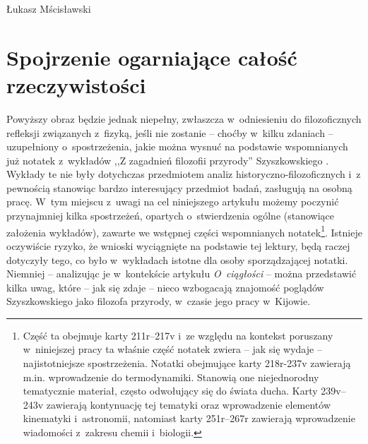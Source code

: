\begin{artplenv}{Łukasz Mścisławski}
\section{Spojrzenie ogarniające całość rzeczywistości}
Powyższy obraz będzie jednak niepełny, zwłaszcza w~odniesieniu do filozoficznych refleksji związanych z~fizyką, jeśli nie zostanie -- choćby w~kilku zdaniach -- uzupełniony o~spostrzeżenia, jakie można wysnuć na podstawie wspomnianych już notatek z~wykładów ,,Z zagadnień filozofii przyrody'' Szyszkowskiego
\parencite[por. ][k. 211–244]{noauthor_noty_1917}. %
 Wykłady te nie były dotychczas przedmiotem analiz historyczno-filozoficznych i~z pewnością stanowiąc bardzo interesujący przedmiot badań, zasługują na osobną pracę. W~tym miejscu z~uwagi na cel niniejszego artykułu możemy poczynić przynajmniej kilka spostrzeżeń, opartych o~stwierdzenia ogólne (stanowiące założenia wykładów), zawarte we wstępnej części wspomnianych notatek\footnote{Część ta obejmuje karty 211r–217v i~ze względu na kontekst poruszany w~niniejszej pracy ta właśnie część notatek zwiera -- jak się wydaje -- najistotniejsze spostrzeżenia. Notatki obejmujące karty 218r-237v zawierają m.in. wprowadzenie do termodynamiki. Stanowią one niejednorodny tematycznie materiał, często odwołujący się do świata ducha. Karty 239v–243v zawierają kontynuację tej tematyki oraz wprowadzenie elementów kinematyki i~astronomii, natomiast karty 251r–267r zawierają wprowadzenie wiadomości z~zakresu chemii i~biologii.}. Istnieje oczywiście ryzyko, że wnioski wyciągnięte na podstawie tej lektury, będą raczej dotyczyły tego, co było w~wykładach istotne dla osoby sporządzającej notatki. Niemniej -- analizując je w~kontekście artykułu \textit{O~ciągłości} -- można przedstawić kilka uwag, które -- jak się zdaje -- nieco wzbogacają znajomość poglądów Szyszkowskiego jako filozofa przyrody, w~czasie jego pracy w~Kijowie.


\end{artplenv}
